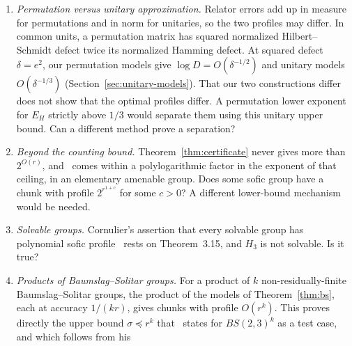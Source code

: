 \documentclass[11pt,a4paper]{article}
\theoremstyle{plain}
\theoremstyle{definition}
\theoremstyle{remark}
\begin{document}
\begin{enumerate}[label=(\arabic*)]
\begin{enumerate}[label=(\alph*),itemsep=1pt]
does not apply to it directly; torsion alone is no obstruction, since Thompson's group $T$ has a quadratic Dehn
function~\cite{Migliorini2025}.
\item The quadratic lower bound of Proposition~\ref{prop:area-lower} counts only cells of type $r_4$; do $O(k^2)$ cells of type $r_4$
suffice to fill $C_k$? For the bounded-multiplicity block problem defined in Section~8,
Proposition~\ref{prop:bc-lower} gives $\mathrm{BC}(K)\ge K(K-1)$ at every scale. Does the matching all-cell upper bound
$\mathrm{BC}(K)=O(K^2)$ hold? By Proposition~\ref{prop:bc-sweep} it would imply~\eqref{eq:conditional-half}.
\end{enumerate}
Whole-suffix fillings and the native Hamming error estimate now improve the pairwise implication. The quadratic upper filling bound
needed to make that improvement unconditional remains open.
\item \emph{Permutation versus unitary approximation.} Relator errors add up in measure for permutations and in norm for unitaries, so the
two profiles may differ. In common units, a permutation matrix has squared normalized Hilbert--Schmidt defect twice its normalized Hamming defect.
At squared defect $\delta=e^2$, our permutation models give $\log D=O(\delta^{-1/2})$ and unitary models
$O(\delta^{-1/3})$ (Section~\ref{sec:unitary-models}). That our two constructions differ does not show that the optimal profiles differ.
A permutation lower exponent for $E_H$ strictly above $1/3$ would separate them using this unitary upper bound. Can a different method prove a separation?
\item \emph{Beyond the counting bound.} Theorem~\ref{thm:certificate} never gives more than $2^{O(r)}$, and~\cite{DouglasMghirbiC}
comes within a polylogarithmic factor in the exponent of that ceiling, in an elementary amenable group. Does some sofic group have a chunk with profile
$2^{r^{1+c}}$ for some $c>0$? A different lower-bound mechanism would be needed.
\item \emph{Solvable groups.} Cornulier's assertion that every solvable group has polynomial sofic profile~\cite[Example~3.16]{Cornulier2013}
rests on Theorem~3.15, and $H_3$ is not solvable. Is it true?
\item \emph{Products of Baumslag--Solitar groups.} For a product of $k$ non-residually-finite Baumslag--Solitar groups, the product of the
models of Theorem~\ref{thm:bs}, each at accuracy $1/(kr)$, gives chunks with profile $O(r^k)$. This proves directly the upper bound
$\sigma\preceq r^k$ that~\cite[Example~3.19]{Cornulier2013} states for $BS(2,3)^k$ as a test case, and which follows from his

\end{enumerate}
\end{document}
